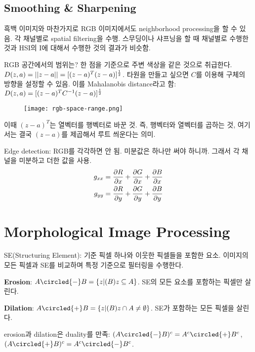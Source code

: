 \subsection{Smoothing \& Sharpening}

흑백 이미지와 마찬가지로 RGB 이미지에서도 neighborhood processing을 할 수 있음. 각 채널별로 spatial filtering을 수행. 스무딩이나 샤프닝을 할 때 채널별로 수행한 것과 HSI의 I에 대해서 수행한 것의 결과가 비슷함.

RGB 공간에서의 범위는? 한 점을 기준으로 주변 색상을 같은 것으로 취급한다. $D(z, a) = ||z - a|| = [(z - a)^T(z - a)]^{1 \over 2}$. 타원을 만들고 싶으면 $C$를 이용해 구체의 방향을 설정할 수 있음. 이를 Mahalanobis distance라고 함: $D(z, a) = [(z - a)^T C^{-1} (z - a)]^{1 \over 2}$

\begin{figure}[h]
  \centering
  \texttt{[image: rgb-space-range.png]}
\end{figure}

이때 $(z - a)^T$는 열벡터를 행벡터로 바꾼 것. 즉, 행벡터와 열벡터를 곱하는 것, 여기서는 결국 $(z - a)$를 제곱해서 루트 씌운다는 의미.

Edge detection: RGB를 각각하면 안 됨. 미분값은 하나만 써야 하니까. 그래서 각 채널을 미분하고 더한 값을 사용.
$$
\begin{aligned}
  g_{xx} &= {\partial R \over \partial x} + {\partial G \over \partial x} + {\partial B \over \partial x} \\
  g_{yy} &= {\partial R \over \partial y} + {\partial G \over \partial y} + {\partial B \over \partial y}
\end{aligned}
$$

\section{Morphological Image Processing}

SE(Structuring Element): 기준 픽셀 하나와 이웃한 픽셀들을 포함한 요소. 이미지의 모든 픽셀과 SE를 비교하며 특정 기준으로 필터링을 수행한다.

\textbf{Erosion}: $A \circled{-} B = \{z | (B)z \subseteq A\}$. SE의 모든 요소를 포함하는 픽셀만 살린다.

\textbf{Dilation}: $A \circled{+} B = \{z | (B)z \cap A \neq \emptyset\}$. SE가 포함하는 모든 픽셀을 살린다.

erosion과 dilation은 duality를 만족: $(A \circled{-} B)^c = A^c \circled{+} B^c$, $(A \circled{+} B)^c = A^c \circled{-} B^c$.

